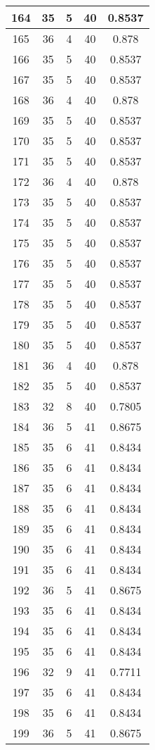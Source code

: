 \documentclass[letterpaper, 12pt]{article}
\begin{document}
\begin{longtable}{|c|c|c|c|c|}
\hline
164 & 35 & 5 & 40 & 0.8537 \\
\hline
165 & 36 & 4 & 40 & 0.878 \\
\hline
166 & 35 & 5 & 40 & 0.8537 \\
\hline
167 & 35 & 5 & 40 & 0.8537 \\
\hline
168 & 36 & 4 & 40 & 0.878 \\
\hline
169 & 35 & 5 & 40 & 0.8537 \\
\hline
170 & 35 & 5 & 40 & 0.8537 \\
\hline
171 & 35 & 5 & 40 & 0.8537 \\
\hline
172 & 36 & 4 & 40 & 0.878 \\
\hline
173 & 35 & 5 & 40 & 0.8537 \\
\hline
174 & 35 & 5 & 40 & 0.8537 \\
\hline
175 & 35 & 5 & 40 & 0.8537 \\
\hline
176 & 35 & 5 & 40 & 0.8537 \\
\hline
177 & 35 & 5 & 40 & 0.8537 \\
\hline
178 & 35 & 5 & 40 & 0.8537 \\
\hline
179 & 35 & 5 & 40 & 0.8537 \\
\hline
180 & 35 & 5 & 40 & 0.8537 \\
\hline
181 & 36 & 4 & 40 & 0.878 \\
\hline
182 & 35 & 5 & 40 & 0.8537 \\
\hline
183 & 32 & 8 & 40 & 0.7805 \\
\hline
184 & 36 & 5 & 41 & 0.8675 \\
\hline
185 & 35 & 6 & 41 & 0.8434 \\
\hline
186 & 35 & 6 & 41 & 0.8434 \\
\hline
187 & 35 & 6 & 41 & 0.8434 \\
\hline
188 & 35 & 6 & 41 & 0.8434 \\
\hline
189 & 35 & 6 & 41 & 0.8434 \\
\hline
190 & 35 & 6 & 41 & 0.8434 \\
\hline
191 & 35 & 6 & 41 & 0.8434 \\
\hline
192 & 36 & 5 & 41 & 0.8675 \\
\hline
193 & 35 & 6 & 41 & 0.8434 \\
\hline
194 & 35 & 6 & 41 & 0.8434 \\
\hline
195 & 35 & 6 & 41 & 0.8434 \\
\hline
196 & 32 & 9 & 41 & 0.7711 \\
\hline
197 & 35 & 6 & 41 & 0.8434 \\
\hline
198 & 35 & 6 & 41 & 0.8434 \\
\hline
199 & 36 & 5 & 41 & 0.8675 \\
\hline
\end{longtable}
\end{document}
